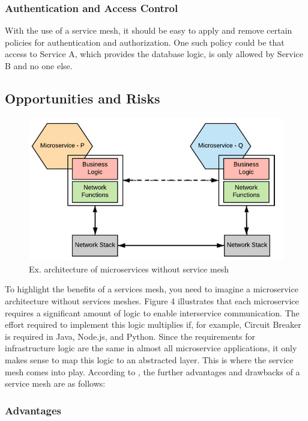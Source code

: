 \subsubsection{Authentication and Access Control}

With the use of a service mesh, it should be easy to apply and remove certain policies for authentication and authorization. One such policy could be that access to Service A, which provides the database logic, is only allowed by Service B and no one else.

\subsection{Opportunities and Risks}

\begin{figure}
    \includegraphics[width=\columnwidth]{img/microservices_without_mesh.JPG}
    \caption{Ex. architecture of microservices without service mesh\cite[S. 265]{sm4}}
    \label{fig:microservice-without-mesh}
\end{figure}

To highlight the benefits of a services mesh, you need to imagine a microservice architecture without services meshes. Figure 4 illustrates that each microservice requires a significant amount of logic to enable interservice communication. The effort required to implement this logic multiplies if, for example, Circuit Breaker is required in Java, Node.js, and Python. Since the requirements for infrastructure logic are the same in almost all microservice applications, it only makes sense to map this logic to an abstracted layer. This is where the service mesh comes into play. According to \cite{sm4}, the further advantages and drawbacks of a service mesh are as follows:

\subsubsection{Advantages}

